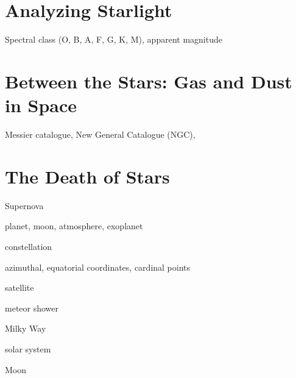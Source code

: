 \documentclass{article}
\begin{document}
\section{}
\section{}
\section{}
\section{}
\section{}
\section{}
\section{Analyzing Starlight}
Spectral class (O, B, A, F, G, K, M), apparent magnitude
\section{}
\section{}
\section{Between the Stars: Gas and Dust in Space}
Messier catalogue, New General Catalogue (NGC),
\section{}
\section{}
\section{The Death of Stars}
Supernova

planet, moon, atmosphere, exoplanet

constellation

azimuthal, equatorial coordinates, cardinal points

satellite

meteor shower

Milky Way

solar system

Moon
\end{document}
